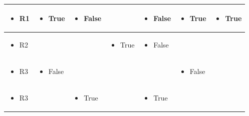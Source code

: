 \documentclass[11pt,a4paper]{article}
\begin{document}
\begin{table}[h]
\begin{tabular}{|l|l|l|l|l|l|l|}
\begin{itemize} \item R1 \end{itemize} & \begin{itemize} \item True \end{itemize} & \begin{itemize} \item False \end{itemize} &  & \begin{itemize} \item False \end{itemize} & \begin{itemize} \item True \end{itemize} & \begin{itemize} \item True \end{itemize} \\ \hline
\begin{itemize} \item R2 \end{itemize} &  &  & \begin{itemize} \item True \end{itemize} & \begin{itemize} \item False \end{itemize} &  &  \\ \hline
\begin{itemize} \item R3 \end{itemize} & \begin{itemize} \item False \end{itemize} &  &  &  & \begin{itemize} \item False \end{itemize} &  \\ \hline
\begin{itemize} \item R3 \end{itemize} &  & \begin{itemize} \item True \end{itemize} &  & \begin{itemize} \item True \end{itemize} &  &  \\ \hline

\end{tabular}
\end{table}
\end{document}
